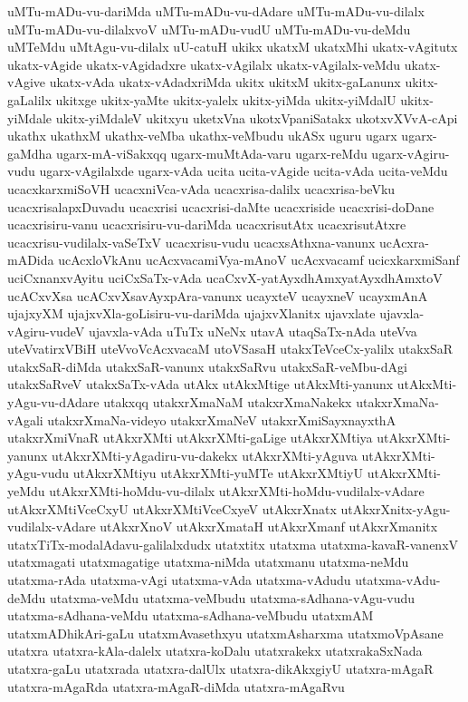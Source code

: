 {uMTu-mADu-vu-dariMda
uMTu-mADu-vu-dAdare
uMTu-mADu-vu-dilalx
uMTu-mADu-vu-dilalxvoV
uMTu-mADu-vudU
uMTu-mADu-vu-deMdu
uMTeMdu
uMtAgu-vu-dilalx
uU-catuH
ukikx
ukatxM
ukatxMhi
ukatx-vAgitutx
ukatx-vAgide
ukatx-vAgidadxre
ukatx-vAgilalx
ukatx-vAgilalx-veMdu
ukatx-vAgive
ukatx-vAda
ukatx-vAdadxriMda
ukitx
ukitxM
ukitx-gaLanunx
ukitx-gaLalilx
ukitxge
ukitx-yaMte
ukitx-yalelx
ukitx-yiMda
ukitx-yiMdalU
ukitx-yiMdale
ukitx-yiMdaleV
ukitxyu
uketxVna
ukotxVpaniSatakx
ukotxvXVvA-cApi
ukathx
ukathxM
ukathx-veMba
ukathx-veMbudu
ukASx
uguru
ugarx
ugarx-gaMdha
ugarx-mA-viSakxqq
ugarx-muMtAda-varu
ugarx-reMdu
ugarx-vAgiru-vudu
ugarx-vAgilalxde
ugarx-vAda
ucita
ucita-vAgide
ucita-vAda
ucita-veMdu
ucacxkarxmiSoVH
ucacxniVca-vAda
ucacxrisa-dalilx
ucacxrisa-beVku
ucacxrisalapxDuvadu
ucacxrisi
ucacxrisi-daMte
ucacxriside
ucacxrisi-doDane
ucacxrisiru-vanu
ucacxrisiru-vu-dariMda
ucacxrisutAtx
ucacxrisutAtxre
ucacxrisu-vudilalx-vaSeTxV
ucacxrisu-vudu
ucacxsAthxna-vanunx
ucAcxra-mADida
ucAcxloVkAnu
ucAcxvacamiVya-mAnoV
ucAcxvacamf
ucicxkarxmiSanf
uciCxnanxvAyitu
uciCxSaTx-vAda
ucaCxvX-yatAyxdhAmxyatAyxdhAmxtoV
ucACxvXsa
ucACxvXsavAyxpAra-vanunx
ucayxteV
ucayxneV
ucayxmAnA
ujajxyXM
ujajxvXla-goLisiru-vu-dariMda
ujajxvXlanitx
ujavxlate
ujavxla-vAgiru-vudeV
ujavxla-vAda
uTuTx
uNeNx
utavA
utaqSaTx-nAda
uteVva
uteVvatirxVBiH
uteVvoVcAcxvacaM
utoVSasaH
utakxTeVceCx-yalilx
utakxSaR
utakxSaR-diMda
utakxSaR-vanunx
utakxSaRvu
utakxSaR-veMbu-dAgi
utakxSaRveV
utakxSaTx-vAda
utAkx
utAkxMtige
utAkxMti-yanunx
utAkxMti-yAgu-vu-dAdare
utakxqq
utakxrXmaNaM
utakxrXmaNakekx
utakxrXmaNa-vAgali
utakxrXmaNa-videyo
utakxrXmaNeV
utakxrXmiSayxnayxthA
utakxrXmiVnaR
utAkxrXMti
utAkxrXMti-gaLige
utAkxrXMtiya
utAkxrXMti-yanunx
utAkxrXMti-yAgadiru-vu-dakekx
utAkxrXMti-yAguva
utAkxrXMti-yAgu-vudu
utAkxrXMtiyu
utAkxrXMti-yuMTe
utAkxrXMtiyU
utAkxrXMti-yeMdu
utAkxrXMti-hoMdu-vu-dilalx
utAkxrXMti-hoMdu-vudilalx-vAdare
utAkxrXMtiVceCxyU
utAkxrXMtiVceCxyeV
utAkxrXnatx
utAkxrXnitx-yAgu-vudilalx-vAdare
utAkxrXnoV
utAkxrXmataH
utAkxrXmanf
utAkxrXmanitx
utatxTiTx-modalAdavu-galilalxdudx
utatxtitx
utatxma
utatxma-kavaR-vanenxV
utatxmagati
utatxmagatige
utatxma-niMda
utatxmanu
utatxma-neMdu
utatxma-rAda
utatxma-vAgi
utatxma-vAda
utatxma-vAdudu
utatxma-vAdu-deMdu
utatxma-veMdu
utatxma-veMbudu
utatxma-sAdhana-vAgu-vudu
utatxma-sAdhana-veMdu
utatxma-sAdhana-veMbudu
utatxmAM
utatxmADhikAri-gaLu
utatxmAvasethxyu
utatxmAsharxma
utatxmoVpAsane
utatxra
utatxra-kAla-dalelx
utatxra-koDalu
utatxrakekx
utatxrakaSxNada
utatxra-gaLu
utatxrada
utatxra-dalUlx
utatxra-dikAkxgiyU
utatxra-mAgaR
utatxra-mAgaRda
utatxra-mAgaR-diMda
utatxra-mAgaRvu
}
